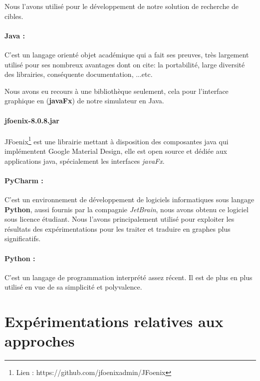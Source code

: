 	Nous l'avons utilisé pour le développement de notre solution de recherche de cibles.
	\vspace{-0.3cm}
	\paragraph{Java : }  C'est un langage orienté objet académique qui a fait ses preuves, très largement utilisé pour ses nombreux avantages dont on cite: la portabilité, large diversité des librairies, conséquente documentation, ...etc.

	Nous avons eu recours à une bibliothèque seulement, cela pour l'interface graphique en (\textbf{javaFx}) de notre simulateur en Java.
	
	\paragraph{jfoenix-8.0.8.jar} JFoenix\footnote{Lien : https://github.com/jfoenixadmin/JFoenix} est une librairie mettant à disposition des composantes java qui implémentent Google Material Design, elle est open source et dédiée aux applications java, spécialement les interfaces \textit{javaFx}. 
	
	\vspace{-0.3cm}
	\paragraph{PyCharm : }	C'est un environnement de développement de logiciels informatiques sous langage \textbf{Python}, aussi fournis par la compagnie \textit{JetBrain}, nous avons obtenu ce logiciel sous licence étudiant.
	Nous l'avons principalement utilisé pour exploiter les résultats des expérimentations pour les traiter et traduire en graphes plus significatifs.
	\vspace{-0.3cm}
	\paragraph{Python : } C'est un langage de programmation interprété assez récent. Il est de plus en plus utilisé en vue de sa simplicité et polyvalence.
	
	
	
	
	
	

	\section{Expérimentations relatives aux approches}
